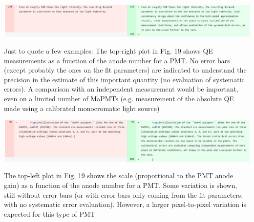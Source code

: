 \documentclass[11pt]{report}
\begin{document}
\includegraphics[width=\linewidth]{round1/2.09.png}



\begin{tcolorbox}[enlarge top by=2em,colbacktitle=black!60!white,colframe=black!80!white,left=0pt,right=0pt,top=0pt,bottom=0pt,boxrule=0.3pt,title=\bfseries2.09a]
Just to quote a few examples: The top-right plot in Fig. 19 shows QE measurements as a function of the anode number for a PMT. No error bars (except probably the ones on the fit parameters) are indicated to understand the precision in the estimate of this important quantity (no evaluation of systematic errors). A comparison with an independent measurement would be important, even on a limited number of MaPMTs (e.g. measurement of the absolute QE made using a calibrated monocromatic light source)
\end{tcolorbox}

\includegraphics[width=\linewidth]{round1/2.09a.png}



\begin{tcolorbox}[enlarge top by=2em,colbacktitle=black!60!white,colframe=black!80!white,left=0pt,right=0pt,top=0pt,bottom=0pt,boxrule=0.3pt,title=\bfseries2.09b]
The top-left plot in Fig. 19 shows the scale (proportional to the PMT anode gain) as a function of the anode number for a PMT. Some variation is shown, still without error bars (or with error bars only coming from the fit parameters, with no systematic error evaluation). However, a larger pixel-to-pixel variation is expected for this type of PMT
\end{tcolorbox}
\end{document}
